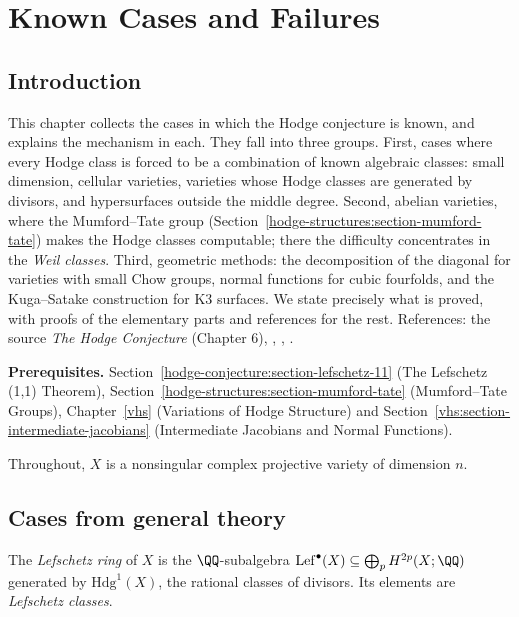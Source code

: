 \chapter{Known Cases and Failures}\label{known-cases}

\section{Introduction}\label{known-cases:section-introduction}

This chapter collects the cases in which the Hodge conjecture is known, and explains the mechanism in each. They fall into three groups. First, cases where every Hodge class
is forced to be a combination of known algebraic classes: small dimension, cellular varieties, varieties whose Hodge classes are generated by divisors, and hypersurfaces outside the middle
degree. Second, abelian varieties, where the Mumford--Tate group (Section~\ref{hodge-structures:section-mumford-tate}) makes the Hodge classes computable; there the difficulty concentrates in the \emph{Weil classes}.
Third, geometric methods: the decomposition of the diagonal for varieties with small Chow groups, normal functions for cubic fourfolds, and the Kuga--Satake construction for K3 surfaces.
We state precisely what is proved, with proofs of the elementary parts and references for the rest. References: the source \emph{The Hodge Conjecture} (Chapter 6),
\cite{lewis-survey}, \cite{birkenhake-lange}, \cite{voisin-hodge-2}.

\noindent\textbf{Prerequisites.} Section~\ref{hodge-conjecture:section-lefschetz-11} (The Lefschetz (1,1) Theorem), Section~\ref{hodge-structures:section-mumford-tate} (Mumford--Tate Groups), Chapter~\ref{vhs} (Variations of Hodge Structure) and
Section~\ref{vhs:section-intermediate-jacobians} (Intermediate Jacobians and Normal Functions).

Throughout, $X$ is a nonsingular complex projective variety of dimension $n$.

\section{Cases from general theory}\label{known-cases:section-general}

\begin{definition}\label{known-cases:definition-lefschetz-classes}
The \emph{Lefschetz ring} of $X$ is the $\QQ$-subalgebra $\mathrm{Lef}^\bullet(X) \subseteq \bigoplus_pH^{2p}(X; \QQ)$ generated by $\mathrm{Hdg}^1(X)$, the rational classes of divisors. Its elements are
\emph{Lefschetz classes}.
\end{definition}

